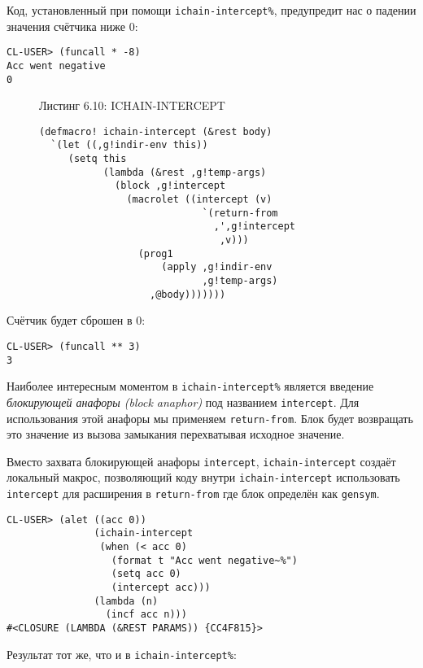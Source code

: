 Код, установленный при помощи \verb"ichain-intercept%", предупредит нас о падении значения счётчика ниже 0:

\begin{verbatim}
CL-USER> (funcall * -8)
Acc went negative
0
\end{verbatim}

\begin{figure}Листинг 6.10: ICHAIN-INTERCEPT\label{listing_6.10}
\listbegin
\begin{verbatim}
(defmacro! ichain-intercept (&rest body)
  `(let ((,g!indir-env this))
     (setq this
           (lambda (&rest ,g!temp-args)
             (block ,g!intercept
               (macrolet ((intercept (v)
                            `(return-from
                              ,',g!intercept
                               ,v)))
                 (prog1
                     (apply ,g!indir-env
                            ,g!temp-args)
                   ,@body)))))))
\end{verbatim}
\listend
\end{figure}

Счётчик будет сброшен в 0:

\begin{verbatim}
CL-USER> (funcall ** 3)
3
\end{verbatim}

Наиболее интересным моментом в \verb"ichain-intercept%" является введение \emph{блокирующей анафоры (block anaphor)} под названием \verb"intercept". Для использования этой анафоры мы применяем \verb"return-from". Блок будет возвращать это значение из вызова замыкания перехватывая исходное значение.

Вместо захвата блокирующей анафоры \verb"intercept", \verb"ichain-intercept" создаёт локальный макрос, позволяющий коду внутри \verb"ichain-intercept" использовать \verb"intercept" для расширения в \verb"return-from" где блок определён как \verb"gensym".

\begin{verbatim}
CL-USER> (alet ((acc 0))
               (ichain-intercept
                (when (< acc 0)
                  (format t "Acc went negative~%")
                  (setq acc 0)
                  (intercept acc)))
               (lambda (n)
                 (incf acc n)))
#<CLOSURE (LAMBDA (&REST PARAMS)) {CC4F815}>
\end{verbatim}

Результат тот же, что и в \verb"ichain-intercept%":

